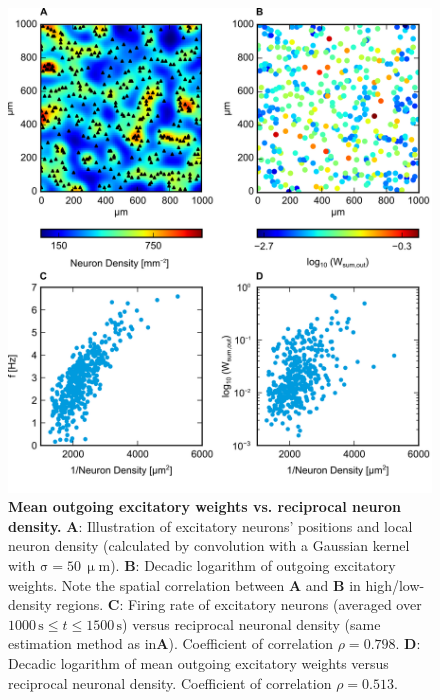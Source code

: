 \documentclass[10pt,letterpaper]{article}
\begin{document}
\begin{figure}
\includegraphics[width=\textwidth]{./figures/scatter_density_out_weights_points_comp_new.png}
\caption{{\bf Mean outgoing excitatory weights vs. reciprocal neuron density.} \textbf{A}: Illustration of excitatory neurons' positions and local neuron density (calculated by convolution with a Gaussian kernel with $\mathrm{\sigma = 50\, \upmu m}$). \textbf{B}: Decadic logarithm of outgoing excitatory weights. Note the spatial correlation between \textbf{A} and \textbf{B} in high/low-density regions. \textbf{C}: Firing rate of excitatory neurons (averaged over $\mathrm{ 1000\,s} \leq t \mathrm{\leq 1500\,s}$) versus reciprocal neuronal density (same estimation method as in\textbf{A}). Coefficient of correlation $\rho = 0.798$. \textbf{D}: Decadic logarithm of mean outgoing excitatory weights versus reciprocal neuronal density. Coefficient of correlation $\rho = 0.513$.}
\label{Inverse_Dens_vs_Sum_Out_Weights}
\end{figure}
\end{document}

